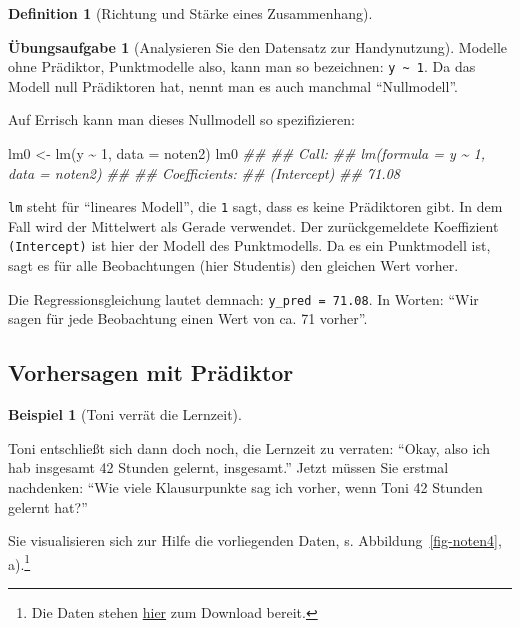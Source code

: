 \documentclass[
  a4paper,
  DIV=11]{scrreprt}
\newenvironment{Shaded}{\begin{snugshade}}{\end{snugshade}}
\newcommand{\AttributeTok}[1]{\textcolor[rgb]{0.40,0.45,0.13}{#1}}
\newcommand{\DecValTok}[1]{\textcolor[rgb]{0.68,0.00,0.00}{#1}}
\newcommand{\DocumentationTok}[1]{\textcolor[rgb]{0.37,0.37,0.37}{\textit{#1}}}
\newcommand{\FunctionTok}[1]{\textcolor[rgb]{0.28,0.35,0.67}{#1}}
\newcommand{\NormalTok}[1]{\textcolor[rgb]{0.00,0.23,0.31}{#1}}
\newcommand{\OtherTok}[1]{\textcolor[rgb]{0.00,0.23,0.31}{#1}}
\newcommand{\SpecialCharTok}[1]{\textcolor[rgb]{0.37,0.37,0.37}{#1}}
\theoremstyle{definition}
\newtheorem{exercise}{Übungsaufgabe}[chapter]
\theoremstyle{definition}
\newtheorem{example}{Beispiel}[chapter]
\theoremstyle{definition}
\newtheorem{definition}{Definition}[chapter]
\theoremstyle{remark}
\begin{document}
\begin{definition}[Richtung und Stärke eines
Zusammenhang]
\begin{exercise}[Analysieren Sie den Datensatz zur
Handynutzung]
Modelle ohne Prädiktor, Punktmodelle also, kann man so bezeichnen:
\texttt{y\ \textasciitilde{}\ 1}. Da das Modell null Prädiktoren hat,
nennt man es auch manchmal ``Nullmodell''.

Auf Errisch kann man dieses Nullmodell so spezifizieren:

\begin{Shaded}
\begin{Highlighting}[]
\NormalTok{lm0 }\OtherTok{\textless{}{-}} \FunctionTok{lm}\NormalTok{(y }\SpecialCharTok{\textasciitilde{}} \DecValTok{1}\NormalTok{, }\AttributeTok{data =}\NormalTok{ noten2)}
\NormalTok{lm0}
\DocumentationTok{\#\# }
\DocumentationTok{\#\# Call:}
\DocumentationTok{\#\# lm(formula = y \textasciitilde{} 1, data = noten2)}
\DocumentationTok{\#\# }
\DocumentationTok{\#\# Coefficients:}
\DocumentationTok{\#\# (Intercept)  }
\DocumentationTok{\#\#       71.08}
\end{Highlighting}
\end{Shaded}

\texttt{lm} steht für ``lineares Modell'', die \texttt{1} sagt, dass es
keine Prädiktoren gibt. In dem Fall wird der Mittelwert als Gerade
verwendet. Der zurückgemeldete Koeffizient \texttt{(Intercept)} ist hier
der Modell des Punktmodells. Da es ein Punktmodell ist, sagt es für alle
Beobachtungen (hier Studentis) den gleichen Wert vorher.

Die Regressionsgleichung lautet demnach: \texttt{y\_pred\ =\ 71.08}. In
Worten: ``Wir sagen für jede Beobachtung einen Wert von ca. 71 vorher''.

\subsection{Vorhersagen mit
Prädiktor}\label{vorhersagen-mit-pruxe4diktor}

\begin{example}[Toni verrät die
Lernzeit]\protect\hypertarget{exm-noten3}{}\label{exm-noten3}

Toni entschließt sich dann doch noch, die Lernzeit zu verraten: ``Okay,
also ich hab insgesamt 42 Stunden gelernt, insgesamt.'' Jetzt müssen Sie
erstmal nachdenken: ``Wie viele Klausurpunkte sag ich vorher, wenn Toni
42 Stunden gelernt hat?''

Sie visualisieren sich zur Hilfe die vorliegenden Daten, s.
Abbildung~\ref{fig-noten4}, a).\footnote{Die Daten stehen
  \href{https://raw.githubusercontent.com/sebastiansauer/statistik1/main/daten/noten2.csv}{hier}
  zum Download bereit.}


\end{example}
\end{exercise}
\end{definition}
\end{document}
